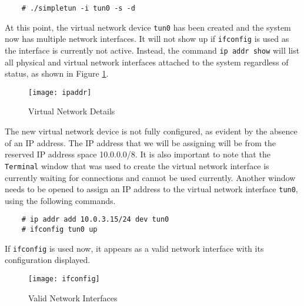 \documentclass[a4paper,12pt]{article}
\begin{document}
	\begin{verbatim}
	# ./simpletun -i tun0 -s -d
	\end{verbatim}
	\noindent At this point, the virtual network device \texttt{tun0} has been created and the system now has multiple network interfaces. It will not show up if \texttt{ifconfig} is used as the interface is currently not active. Instead, the command \texttt{ip addr show} will list all physical and virtual network interfaces attached to the system regardless of status, as shown in Figure \ref{fig:VirtNet}.
	
	\begin{figure}[H]
		\centering
		\texttt{[image: ipaddr]}
		\caption{Virtual Network Details}
		\label{fig:VirtNet}
	\end{figure}
	\noindent The new virtual network device is not fully configured, as evident by the absence of an IP address. The IP address that we will be assigning will be from the reserved IP address space 10.0.0.0/8. It is also important to note that the \texttt{Terminal} window that was used to create the virtual network interface is currently waiting for connections and cannot be used currently. Another window needs to be opened to assign an IP address to the virtual network interface \texttt{tun0}, using the following commands.
	\begin{verbatim}
	# ip addr add 10.0.3.15/24 dev tun0
	# ifconfig tun0 up
	\end{verbatim}
	If \texttt{ifconfig} is used now, it appears as a valid network interface with its configuration displayed.
	
	\begin{figure}[H]
		\centering
		\texttt{[image: ifconfig]}
		\caption{Valid Network Interfaces}
		\label{fig:ifconfig}
	\end{figure}
\end{document}
